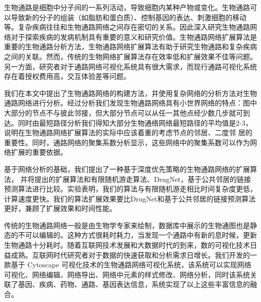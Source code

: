 \begin{conclusions}
生物通路是细胞中分子间的一系列活动，导致细胞内某种产物或变化。生物通路可以导致新的分子的组装（如脂肪和蛋白质）、控制基因的表达、刺激细胞的移动等。复杂疾病往往和生物通路网络之间存在密切的关系。因此深入研究生物通路网络对于探索疾病的发病机制具有重要的意义和研究价值。生物通路网络扩展算法是重要的生物通路分析方法，生物通路网络扩展算法有助于研究生物通路和复杂疾病之间的关联。然而，传统的生物网络扩展算法存在效率低和扩展效果不佳等问题。另一方面，研究者对于通路网络可视化系统具有很大需求，而现行通路可视化系统存在着授权费用高，交互体验差等问题。

我们在本文中提出了生物通路网络的构建方法，并使用复杂网络的分析方法对生物通路网络进行分析。经过分析我们发现生物通路网络具有小世界网络的特点：图中大部分的节点不与彼此邻接，但大部分节点可以从任一其他点经少数几步就可到达。同时由最短路径分析我们得知大部分生物通络网络最短路径的平均值是2-3，说明在生物通路网络扩展算法的实际中应该着重的考虑节点的邻居、二度邻
居的重要性。同时，通路网络的聚集系数分析显示，这些网络中的聚集系数可以作为网络扩展的重要依据。

基于网络分析的基础，我们提出了一种基于深度优先策略的生物通路网络的扩展算法， 并将提出的扩展算法和有限随机游走算法、DrugNet，基于公共邻居的链接预测算法进行比较。实验表明，我们的算法与有限随机游走相比时间复杂度更低，计算速度更快。我们的算法扩展效果要比DrugNet和基于公共邻居的链接预测算法更好，兼顾了扩展效果和时间性能。

传统的生物通路网络一般是由生物学专家来绘制，数据库中展示的生物通图也是静态的不可以编辑的。这种方式很耗时耗力，当发现一个通路中有新的息时候，更新生物通路十分耗时。随着互联网技术发展和大数据时代的到来，数的可视化技术日益成熟。互联网时代研究者对于数据的快速获取和分析需求日增长。我们开发的一款基于 Cytoscape 可视化技术的生物通路网络可视化系统，该系统可以实现网络可视化、网络编辑、网络导出、网络中元素的样式修改、网络分析，同时该系统关联了基因、疾病、药物、通路、基因表达信息，系统实现了以上这些丰富信息的融合。


\end{conclusions}
